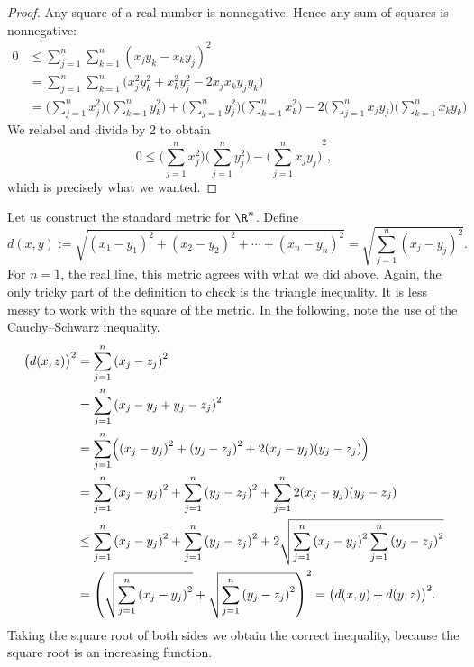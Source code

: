 \documentclass[12pt]{book}
\begin{document}
\begin{proof}
Any square of a real number is nonnegative.
Hence any sum of squares is
nonnegative:
\begin{equation*}
\begin{split}
0 & \leq 
\sum_{j=1}^n \sum_{k=1}^n {(x_j y_k - x_k y_j)}^2
\\
& =
\sum_{j=1}^n \sum_{k=1}^n \bigl( x_j^2 y_k^2 + x_k^2 y_j^2 - 2 x_j x_k y_j
y_k \bigr)
\\
& =
\biggl( \sum_{j=1}^n x_j^2 \biggr)
\biggl( \sum_{k=1}^n y_k^2 \biggr)
+
\biggl( \sum_{j=1}^n y_j^2 \biggr)
\biggl( \sum_{k=1}^n x_k^2 \biggr)
-
2
\biggl( \sum_{j=1}^n x_j y_j \biggr)
\biggl( \sum_{k=1}^n x_k y_k \biggr)
\end{split}
\end{equation*}
We relabel and divide by 2 to obtain
\begin{equation*}
0 \leq 
\biggl( \sum_{j=1}^n x_j^2 \biggr)
\biggl( \sum_{j=1}^n y_j^2 \biggr)
-
{\biggl( \sum_{j=1}^n x_j y_j \biggr)}^2 ,
\end{equation*}
which is precisely what we wanted.
\end{proof}

\begin{example}
Let us construct the
standard metric for $\R^n$.
Define
\begin{equation*}
d(x,y) :=
\sqrt{
{(x_1-y_1)}^2 + 
{(x_2-y_2)}^2 + 
\cdots +
{(x_n-y_n)}^2
} =
\sqrt{
\sum_{j=1}^n
{(x_j-y_j)}^2 
} .
\end{equation*}
For $n=1$, the real line, this metric agrees with what we did above.
Again,
the only tricky part of the definition to check is the triangle inequality.
It is less messy to work with the square of the metric.
In the
following, note the use of the Cauchy--Schwarz inequality.
\begin{equation*}
\begin{split}
{\bigl(d(x,z)\bigr)}^2 & =
\sum_{j=1}^n
{(x_j-z_j)}^2 
\\
& =
\sum_{j=1}^n
{(x_j-y_j+y_j-z_j)}^2 
\\
& =
\sum_{j=1}^n
\Bigl(
{(x_j-y_j)}^2+{(y_j-z_j)}^2 + 2(x_j-y_j)(y_j-z_j)
\Bigr)
\\
& =
\sum_{j=1}^n
{(x_j-y_j)}^2
+
\sum_{j=1}^n
{(y_j-z_j)}^2 
+
\sum_{j=1}^n
 2(x_j-y_j)(y_j-z_j)
\\
& \leq
\sum_{j=1}^n
{(x_j-y_j)}^2
+
\sum_{j=1}^n
{(y_j-z_j)}^2 
+
2
\sqrt{
\sum_{j=1}^n
{(x_j-y_j)}^2
\sum_{j=1}^n
{(y_j-z_j)}^2
}
\\
& =
{\left(
\sqrt{
\sum_{j=1}^n
{(x_j-y_j)}^2
}
+
\sqrt{
\sum_{j=1}^n
{(y_j-z_j)}^2 
}
\right)}^2
=
{\bigl( d(x,y) + d(y,z) \bigr)}^2 .
\end{split}
\end{equation*}
Taking the square root of both sides we obtain the correct inequality,
because the square root is an increasing function.
\end{example}
\end{document}
